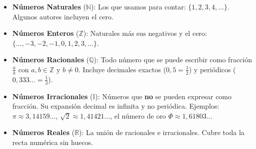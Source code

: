 \documentclass[12pt, letterpaper]{article}
\begin{document}
\begin{cuadroteoria}
  \begin{itemize}[leftmargin=*]
    \item \textbf{Números Naturales} ($\mathbb{N}$): Los que usamos para contar: $\{1, 2, 3, 4, \ldots\}$. Algunos autores incluyen el cero.
    \item \textbf{Números Enteros} ($\mathbb{Z}$): Naturales más sus negativos y el cero: $\{\ldots, -3, -2, -1, 0, 1, 2, 3, \ldots\}$.
    \item \textbf{Números Racionales} ($\mathbb{Q}$): Todo número que se puede escribir como fracción $\frac{a}{b}$ con $a, b \in \mathbb{Z}$ y $b \neq 0$. Incluye decimales exactos ($0{,}5 = \frac{1}{2}$) y periódicos ($0{,}333\ldots = \frac{1}{3}$).
    \item \textbf{Números Irracionales} ($\mathbb{I}$): Números que \textbf{no} se pueden expresar como fracción. Su expansión decimal es infinita y no periódica. Ejemplos: $\pi \approx 3{,}14159\ldots$, $\sqrt{2} \approx 1{,}41421\ldots$, el número de oro $\Phi \approx 1{,}61803\ldots$
    \item \textbf{Números Reales} ($\mathbb{R}$): La unión de racionales e irracionales. Cubre toda la recta numérica sin huecos.
  \end{itemize}
\end{cuadroteoria}
\end{document}
